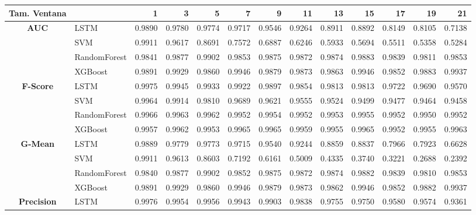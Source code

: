 \begin{table}[h]
	\centering
	\begin{adjustbox}{max width=15cm}
		\begin{tabular}{|c|l|r|r|r|r|r|r|r|r|r|r|r|}
			\hline
			\textbf{Tam. Ventana}&         &      1  &      3  &      5  &      7  &      9  &      11 &      13 &      15 &      17 &      19 &      21 \\
			\hline
			\textbf{AUC} & LSTM &  0.9890 &  0.9780 &  0.9774 &  0.9717 &  0.9546 &  0.9264 &  0.8911 &  0.8892 &  0.8149 &  0.8105 &  0.7138 \\
			& SVM &  0.9911 &  0.9617 &  0.8691 &  0.7572 &  0.6887 &  0.6246 &  0.5933 &  0.5694 &  0.5511 &  0.5358 &  0.5284 \\
			& RandomForest &  0.9841 &  0.9877 &  0.9902 &  0.9853 &  0.9875 &  0.9872 &  0.9874 &  0.9883 &  0.9839 &  0.9811 &  0.9853 \\
			& XGBoost &  0.9891 &  0.9929 &  0.9860 &  0.9946 &  0.9879 &  0.9873 &  0.9863 &  0.9946 &  0.9852 &  0.9883 &  0.9937 \\
			\hline
			\textbf{F-Score} & LSTM &  0.9975 &  0.9945 &  0.9933 &  0.9922 &  0.9897 &  0.9854 &  0.9813 &  0.9813 &  0.9722 &  0.9690 &  0.9570 \\
			& SVM &  0.9964 &  0.9914 &  0.9810 &  0.9689 &  0.9621 &  0.9555 &  0.9524 &  0.9499 &  0.9477 &  0.9464 &  0.9458 \\
			& RandomForest &  0.9966 &  0.9963 &  0.9962 &  0.9952 &  0.9954 &  0.9952 &  0.9953 &  0.9955 &  0.9952 &  0.9950 &  0.9952 \\
			& XGBoost &  0.9957 &  0.9962 &  0.9953 &  0.9965 &  0.9965 &  0.9959 &  0.9955 &  0.9965 &  0.9952 &  0.9955 &  0.9963 \\
			\hline
			\textbf{G-Mean} & LSTM &  0.9889 &  0.9779 &  0.9773 &  0.9715 &  0.9540 &  0.9244 &  0.8859 &  0.8837 &  0.7966 &  0.7923 &  0.6628 \\
			& SVM &  0.9911 &  0.9613 &  0.8603 &  0.7192 &  0.6161 &  0.5009 &  0.4335 &  0.3740 &  0.3221 &  0.2688 &  0.2392 \\
			& RandomForest &  0.9840 &  0.9877 &  0.9902 &  0.9852 &  0.9875 &  0.9872 &  0.9874 &  0.9882 &  0.9839 &  0.9810 &  0.9853 \\
			& XGBoost &  0.9891 &  0.9929 &  0.9860 &  0.9946 &  0.9879 &  0.9873 
			&  0.9862 &  0.9946 &  0.9852 &  0.9882 &  0.9937 \\
			\hline
			\textbf{Precision} & LSTM &  0.9976 &  0.9954 &  0.9956 &  0.9943 &  0.9903 &  0.9838 &  0.9755 &  0.9750 &  0.9580 &  0.9574 &  0.9361 \\

\end{tabular}
\end{adjustbox}
\end{table}
